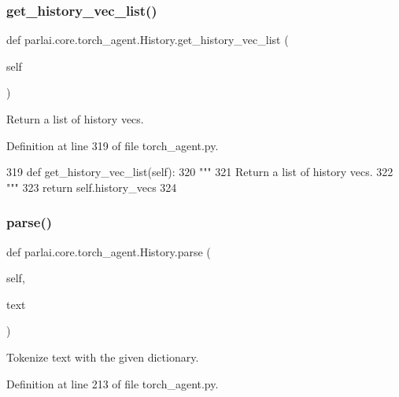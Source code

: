 \subsubsection{\texorpdfstring{get\+\_\+history\+\_\+vec\+\_\+list()}{get\_history\_vec\_list()}}
{\footnotesize\ttfamily def parlai.\+core.\+torch\+\_\+agent.\+History.\+get\+\_\+history\+\_\+vec\+\_\+list (\begin{DoxyParamCaption}\item[{}]{self }\end{DoxyParamCaption})}

\begin{DoxyVerb}Return a list of history vecs.
\end{DoxyVerb}
 

Definition at line 319 of file torch\+\_\+agent.\+py.


\begin{DoxyCode}
319     \textcolor{keyword}{def }get\_history\_vec\_list(self):
320         \textcolor{stringliteral}{"""}
321 \textcolor{stringliteral}{        Return a list of history vecs.}
322 \textcolor{stringliteral}{        """}
323         \textcolor{keywordflow}{return} self.history\_vecs
324 
\end{DoxyCode}
\mbox{\label{classparlai_1_1core_1_1torch__agent_1_1History_a7758c7e9d42442ac228b820be4298d84}} 
\subsubsection{\texorpdfstring{parse()}{parse()}}
{\footnotesize\ttfamily def parlai.\+core.\+torch\+\_\+agent.\+History.\+parse (\begin{DoxyParamCaption}\item[{}]{self,  }\item[{}]{text }\end{DoxyParamCaption})}

\begin{DoxyVerb}Tokenize text with the given dictionary.
\end{DoxyVerb}
 

Definition at line 213 of file torch\+\_\+agent.\+py.


